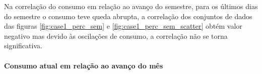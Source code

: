     	            Na correlação do consumo em relação ao avanço do semestre, para os últimos dias do semestre o consumo teve queda abrupta, a correlação dos conjuntos de dados das figuras \ref{fig:case1_perc_sem} e \ref{fig:case1_perc_sem_scatter} obtém valor negativo mas devido às oscilações de consumo, a correlação não se torna significativa.
    	      
              \paragraph{Consumo atual em relação ao avanço do mês}
                
                {
                \begin{center} 
                    \begin{minipage}[c]{0.45\textwidth}
                        \begin{figure}[H]
                        \end{figure}
                    \end{minipage} \hfill %
                    

\end{center}}
